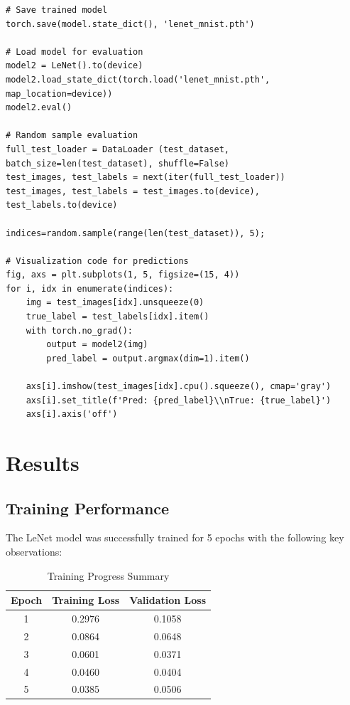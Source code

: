 \documentclass[a4paper, journal]{IEEEtran}
\begin{document}
\begin{lstlisting}[caption=Model Save/Load and Evaluation]
# Save trained model
torch.save(model.state_dict(), 'lenet_mnist.pth')

# Load model for evaluation
model2 = LeNet().to(device)
model2.load_state_dict(torch.load('lenet_mnist.pth', map_location=device))
model2.eval()

# Random sample evaluation
full_test_loader = DataLoader (test_dataset, batch_size=len(test_dataset), shuffle=False)
test_images, test_labels = next(iter(full_test_loader))
test_images, test_labels = test_images.to(device), test_labels.to(device)

indices=random.sample(range(len(test_dataset)), 5);

# Visualization code for predictions
fig, axs = plt.subplots(1, 5, figsize=(15, 4))
for i, idx in enumerate(indices):
    img = test_images[idx].unsqueeze(0)
    true_label = test_labels[idx].item()
    with torch.no_grad():
        output = model2(img)
        pred_label = output.argmax(dim=1).item()
    
    axs[i].imshow(test_images[idx].cpu().squeeze(), cmap='gray')
    axs[i].set_title(f'Pred: {pred_label}\\nTrue: {true_label}')
    axs[i].axis('off')
\end{lstlisting}





\section{Results}

\subsection{Training Performance}

The LeNet model was successfully trained for 5 epochs with the following key observations:

\begin{table}[h]
    \centering
    \caption{Training Progress Summary}
    \label{tab:training_results}
    \begin{tabular}{ccc}
        \toprule
        Epoch             & Training Loss & Validation Loss \\
        \midrule        1 & 0.2976        & 0.1058          \\
        2                 & 0.0864        & 0.0648          \\
        3                 & 0.0601        & 0.0371          \\
        4                 & 0.0460        & 0.0404          \\
        5                 & 0.0385        & 0.0506          \\
        \bottomrule
    \end{tabular}
\end{table}
\end{document}

